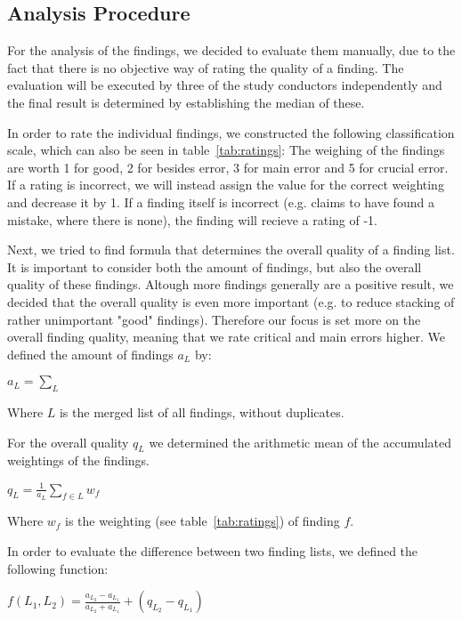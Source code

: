 \subsection{Analysis Procedure}

For the analysis of the findings, we decided to evaluate them manually, due to the fact that there is no objective way of rating the quality of a finding. The evaluation will be executed by three of the study conductors independently and the final result is determined by establishing the median of these.

In order to rate the individual findings, we constructed the following classification scale, which can also be seen in table~\ref{tab:ratings}:
The weighing of the findings are worth 1 for good, 2 for besides error, 3 for main error and 5 for crucial error. If a rating is incorrect, we will instead assign the value for the correct weighting and decrease it by 1.
If a finding itself is incorrect (e.g. claims to have found a mistake, where there is none), the finding will recieve a rating of -1.

Next, we tried to find formula that determines the overall quality of a finding list. It is important to consider both the amount of findings, but also the overall quality of these findings. Altough more findings generally are a positive result, we decided that the overall quality is even more important (e.g. to reduce stacking of rather unimportant "good" findings). Therefore our focus is set more on the overall finding quality, meaning that we rate critical and main errors higher.
We defined the amount of findings $a_L$ by:
\begin{center}

$a_L = \sum_{L}$
\end{center}

Where $L$ is the merged list of all findings, without duplicates.

For the overall quality $q_L$ we determined the arithmetic mean of the accumulated weightings of the findings.

\begin{center}
{$q_L = \frac{1}{a_L} \sum_{f \in L} w_f$}
\end{center}

Where $w_f$ is the weighting (see table~\ref{tab:ratings}) of finding $f$.

In order to evaluate the difference between two finding lists, we defined the following function:

\begin{center}
$f(L_1, L_2) = \frac{a_{L_2} - a_{L_1}}{a_{L_2} + a_{L_1}} + (q_{L_2} - q_{L_1}) $
\end{center}

